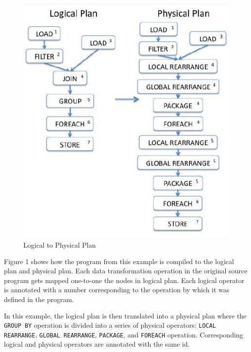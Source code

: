 \begin{figure}
\begin{center}
\includegraphics[scale=0.5]{Images/LogicalPhysicalPlan.JPG}
\end{center}
\caption{Logical to Physical Plan \cite{gates2009building}}
\end{figure}

Figure 1 shows how the program from this example is compiled to the logical plan and physical plan. Each data transformation operation in the original source program gets mapped one-to-one the nodes in logical plan. Each logical operator is annotated with a number corresponding to the operation by which it was defined in the program.

In this example, the logical plan is then translated into a physical plan where the \texttt{GROUP BY} operation is divided into a series of physical operators: \texttt{LOCAL REARRANGE}, \texttt{GLOBAL REARRANGE}, \texttt{PACKAGE}, and \texttt{FOREACH} operation. Corresponding logical and physical operators are annotated with the same id.
